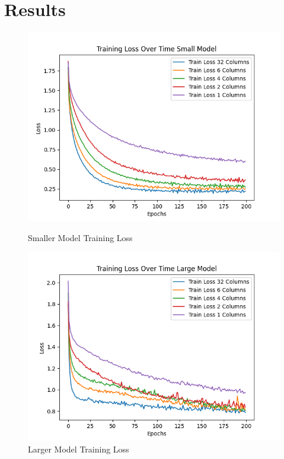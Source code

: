 \documentclass{article}
\begin{document}
\section{Results}
\begin{figure}
		\includegraphics[width = \linewidth]{figures/train_loss_over_time_small.png}
		\caption{Smaller Model Training Loss}
	\endminipage\hfill
		\includegraphics[width = \linewidth]{figures/loss_over_time_large_model.png}
		\caption{Larger Model Training Loss}
	\endminipage\hfill	
\end{figure}
\end{document}
